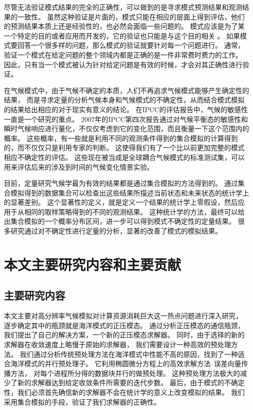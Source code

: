 尽管无法验证模式结果的完全的正确性，可以做到的是寻求模式预测结果和观测结果的一致性。
虽然这种验证是片面的，模式只能在相应的层面上得到评估，他们的预测结果本质上还是经验性的，也必然会面临一些问题的。
模式应该是为了某一个特定的目的或者应用而开发的，它的验证也只能是与这个目的相关\cite{sargent2005verification} 。 
如果模式要回答一个很多样的问题，那么模式的验证就要针对每一个问题进行。
通常，验证一个模式在给定问题的整个领域内都是正确的是一件非常费时费力的工作。 
因此，只有当一个模式被认为针对给定问题是有效的时候，才会对其正确性进行验证。 

在气候模式中，由于气候不确定的本质，人们不再追求气候模式能够产生确定性的结果，
而是寻求定量的分析气候本身和气候模式的不确定性，从而结合模式模拟的结果给出相应的对于现实有意义的结论。
在IPCC的评估报告中，气候的敏感性一直是一个研究的重点\cite{meehl2007global}。
2007年的IPCC第四次报告通过对气候平衡态的敏感性和瞬时气候响应进行量化，不仅仅考虑到它的变化范围，而且衡量一下这个范围内的概率。
这些概率，有一些就是利用不同的观测条件得到的集合模拟的计算得到的，而不仅仅只是利用专家的判断。 
这使得我们有了一个比以前更加完整的模式相应不确定性的评估。 
这些现在被当成是全球耦合气候模式的标准测试集，可以用来评估后来的涉及到时间的气候变化情景实验。 
 
目前，定量研究气候学最为有效的结果都是通过集合模拟的方法得到的\cite{von2013testing,reynolds1994random, allen2002towards}。
通过集合模拟得到的数据集合可以检查出这些结果所描述当前状态和未来状态的统计学上的显著差别。
这个显著性的定义，就是定义一个结果的统计学上零假设，然后应用于从相同的取样策略得到的不同的观测结果。 
这种统计学的方法，最终可以给出集合模拟的一个概率分布区间，进一步可以得到模式不确定性的定量结果。
很多研究通过对不确定性进行定量的分析，显著的改善了模式的模拟结果\cite{reynolds1994random}。


\section{本文主要研究内容和主要贡献}
\subsection{主要研究内容}
本文主要对高分辨率气候模拟对计算资源消耗巨大这一热点问题进行深入研究，
逐步确定其中的瓶颈就是海洋模式的正压模态。
通过分析正压模态的通信瓶颈，我们提出了自己的解决方案，一个新的正压模态求解器。
同时，由于选择的新的求解器在收敛速度上略慢于原始的求解器， 我们需要设计一种高效的预处理方法。
我们通过分析传统预处理方法在海洋模式中性能不高的原因，找到了一种适合海洋模式的并行预处理子。 它利用椭圆微分方程上的高效求解方法--误差向量传播方法， 对每个进程所分得的数据块并行的做预处理。 
这种预处理方法极大的减少了新的求解器达到给定收敛条件所需要的迭代步数。
最后，由于模式的不确定性，我们必须首先确信新的求解器不会在统计学的意义上改变模拟的结果。 
我们采用集合模拟的手段，验证了我们求解器的正确性。 

